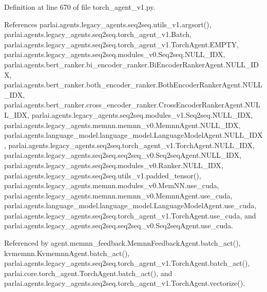 Definition at line 670 of file torch\+\_\+agent\+\_\+v1.\+py.



References parlai.\+agents.\+legacy\+\_\+agents.\+seq2seq.\+utils\+\_\+v1.\+argsort(), parlai.\+agents.\+legacy\+\_\+agents.\+seq2seq.\+torch\+\_\+agent\+\_\+v1.\+Batch, parlai.\+agents.\+legacy\+\_\+agents.\+seq2seq.\+torch\+\_\+agent\+\_\+v1.\+Torch\+Agent.\+E\+M\+P\+TY, parlai.\+agents.\+legacy\+\_\+agents.\+seq2seq.\+modules\+\_\+v0.\+Seq2seq.\+N\+U\+L\+L\+\_\+\+I\+DX, parlai.\+agents.\+bert\+\_\+ranker.\+bi\+\_\+encoder\+\_\+ranker.\+Bi\+Encoder\+Ranker\+Agent.\+N\+U\+L\+L\+\_\+\+I\+DX, parlai.\+agents.\+bert\+\_\+ranker.\+both\+\_\+encoder\+\_\+ranker.\+Both\+Encoder\+Ranker\+Agent.\+N\+U\+L\+L\+\_\+\+I\+DX, parlai.\+agents.\+bert\+\_\+ranker.\+cross\+\_\+encoder\+\_\+ranker.\+Cross\+Encoder\+Ranker\+Agent.\+N\+U\+L\+L\+\_\+\+I\+DX, parlai.\+agents.\+legacy\+\_\+agents.\+seq2seq.\+modules\+\_\+v1.\+Seq2seq.\+N\+U\+L\+L\+\_\+\+I\+DX, parlai.\+agents.\+legacy\+\_\+agents.\+memnn.\+memnn\+\_\+v0.\+Memnn\+Agent.\+N\+U\+L\+L\+\_\+\+I\+DX, parlai.\+agents.\+language\+\_\+model.\+language\+\_\+model.\+Language\+Model\+Agent.\+N\+U\+L\+L\+\_\+\+I\+DX, parlai.\+agents.\+legacy\+\_\+agents.\+seq2seq.\+torch\+\_\+agent\+\_\+v1.\+Torch\+Agent.\+N\+U\+L\+L\+\_\+\+I\+DX, parlai.\+agents.\+legacy\+\_\+agents.\+seq2seq.\+seq2seq\+\_\+v0.\+Seq2seq\+Agent.\+N\+U\+L\+L\+\_\+\+I\+DX, parlai.\+agents.\+legacy\+\_\+agents.\+seq2seq.\+modules\+\_\+v0.\+Ranker.\+N\+U\+L\+L\+\_\+\+I\+DX, parlai.\+agents.\+legacy\+\_\+agents.\+seq2seq.\+utils\+\_\+v1.\+padded\+\_\+tensor(), parlai.\+agents.\+legacy\+\_\+agents.\+memnn.\+modules\+\_\+v0.\+Mem\+N\+N.\+use\+\_\+cuda, parlai.\+agents.\+legacy\+\_\+agents.\+memnn.\+memnn\+\_\+v0.\+Memnn\+Agent.\+use\+\_\+cuda, parlai.\+agents.\+language\+\_\+model.\+language\+\_\+model.\+Language\+Model\+Agent.\+use\+\_\+cuda, parlai.\+agents.\+legacy\+\_\+agents.\+seq2seq.\+torch\+\_\+agent\+\_\+v1.\+Torch\+Agent.\+use\+\_\+cuda, and parlai.\+agents.\+legacy\+\_\+agents.\+seq2seq.\+seq2seq\+\_\+v0.\+Seq2seq\+Agent.\+use\+\_\+cuda.



Referenced by agent.\+memnn\+\_\+feedback.\+Memnn\+Feedback\+Agent.\+batch\+\_\+act(), kvmemnn.\+Kvmemnn\+Agent.\+batch\+\_\+act(), parlai.\+agents.\+legacy\+\_\+agents.\+seq2seq.\+torch\+\_\+agent\+\_\+v1.\+Torch\+Agent.\+batch\+\_\+act(), parlai.\+core.\+torch\+\_\+agent.\+Torch\+Agent.\+batch\+\_\+act(), and parlai.\+agents.\+legacy\+\_\+agents.\+seq2seq.\+torch\+\_\+agent\+\_\+v1.\+Torch\+Agent.\+vectorize().

